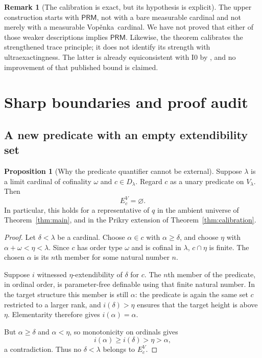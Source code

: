 \documentclass[11pt,letterpaper]{article}
\theoremstyle{definition}
\newtheorem{proposition}[definition]{Proposition}
\newtheorem{remark}[definition]{Remark}
\numberwithin{equation}{section}
\newcommand{\PRM}{\mathsf{PRM}}
\newcommand{\Vop}{Vop\v{e}nka}
\begin{document}
\begin{remark}[The calibration is exact, but its hypothesis is explicit]
The upper construction starts with $\PRM$, not with a bare measurable cardinal and not merely with a measurable \Vop\ cardinal. We have not proved that either of those weaker descriptions implies $\PRM$. Likewise, the theorem calibrates the strengthened trace principle; it does not identify its strength with ultraexactingness. The latter is already equiconsistent with $\mathrm{I0}$ by \cite[Theorem~4.5]{abgl}, and no improvement of that published bound is claimed.
\end{remark}

\section{Sharp boundaries and proof audit}\label{sec:boundaries}

\subsection{A new predicate with an empty extendibility set}

\begin{proposition}[Why the predicate quantifier cannot be external]\label{prop:empty}
Suppose $\lambda$ is a limit cardinal of cofinality $\omega$ and $c\in D_\lambda$. Regard $c$ as a unary predicate on $V_\lambda$. Then
\[
 E_c^V=\varnothing.
\]
In particular, this holds for a representative of $q$ in the ambient universe of Theorem~\ref{thm:main}, and in the Prikry extension of Theorem~\ref{thm:calibration}.
\end{proposition}

\begin{proof}
Let $\delta<\lambda$ be a cardinal. Choose $\alpha\in c$ with $\alpha\ge\delta$, and choose $\eta$ with $\alpha+\omega<\eta<\lambda$. Since $c$ has order type $\omega$ and is cofinal in $\lambda$, $c\cap\eta$ is finite. The chosen $\alpha$ is its $n$th member for some natural number $n$.

Suppose $i$ witnessed $\eta$-extendibility of $\delta$ for $c$. The $n$th member of the predicate, in ordinal order, is parameter-free definable using that finite natural number. In the target structure this member is still $\alpha$: the predicate is again the same set $c$ restricted to a larger rank, and $i(\delta)>\eta$ ensures that the target height is above $\eta$. Elementarity therefore gives $i(\alpha)=\alpha$.

But $\alpha\ge\delta$ and $\alpha<\eta$, so monotonicity on ordinals gives
\[
 i(\alpha)\ge i(\delta)>\eta>\alpha,
\]
a contradiction. Thus no $\delta<\lambda$ belongs to $E_c^V$.
\end{proof}
\end{document}
